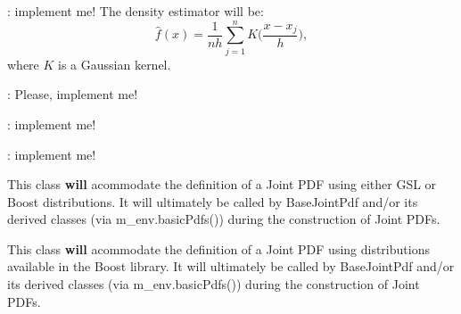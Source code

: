 
\begin{DoxyRefList}
\item[\label{todo__todo000013}%
\hypertarget{todo__todo000013}{}%
Member \hyperlink{class_q_u_e_s_o_1_1_array_of_sequences_a221a49bf0e054276007dde487dbedfe6}{Q\-U\-E\-S\-O\-:\-:Array\-Of\-Sequences$<$ V, M $>$\-:\-:gaussian\-K\-D\-E} (unsigned int initial\-Pos, const V \&scales, const std\-::vector$<$ V $\ast$ $>$ \&evaluation\-Param\-Vecs, std\-::vector$<$ V $\ast$ $>$ \&density\-Vecs) const ]\-: implement me! The density estimator will be\-: \[ \hat{f}(x) = \frac{1}{nh} \sum_{j=1}^n K\Big(\frac{x-x_j}{h}\Big),\] where $ K $ is a Gaussian kernel.  
\item[\label{todo__todo000004}%
\hypertarget{todo__todo000004}{}%
Member \hyperlink{class_q_u_e_s_o_1_1_base1_d1_d_function_ac41e4e15b7f97c14a0389069bf8e833d}{Q\-U\-E\-S\-O\-:\-:Base1\-D1\-D\-Function\-:\-:multiply\-And\-Integrate} (const Base1\-D1\-D\-Function \&func, unsigned int quadrature\-Order, double $\ast$result\-With\-Multiplication\-By\-T\-As\-Well) const ]\-: Please, implement me!  
\item[\label{todo__todo000050}%
\hypertarget{todo__todo000050}{}%
Member \hyperlink{class_q_u_e_s_o_1_1_base_t_k_group_ad6f7aa1ed1f75476b46333847e5086ba}{Q\-U\-E\-S\-O\-:\-:Base\-T\-K\-Group$<$ V, M $>$\-:\-:print} (std\-::ostream \&os) const ]\-: implement me!  
\item[\label{todo__todo000054}%
\hypertarget{todo__todo000054}{}%
Member \hyperlink{class_q_u_e_s_o_1_1_base_vector_r_v_a5296b918534e12e5b62ac7cb5d20a1e8}{Q\-U\-E\-S\-O\-:\-:Base\-Vector\-R\-V$<$ V, M $>$\-:\-:print} (std\-::ostream \&os) const =0]\-: implement me!  
\item[\label{todo__todo000001}%
\hypertarget{todo__todo000001}{}%
Class \hyperlink{class_q_u_e_s_o_1_1_basic_pdfs_base}{Q\-U\-E\-S\-O\-:\-:Basic\-Pdfs\-Base} ]This class {\bfseries will} acommodate the definition of a Joint P\-D\-F using either G\-S\-L or Boost distributions. It will ultimately be called by Base\-Joint\-Pdf and/or its derived classes (via m\-\_\-env.\-basic\-Pdfs()) during the construction of Joint P\-D\-Fs.  
\item[\label{todo__todo000002}%
\hypertarget{todo__todo000002}{}%
Class \hyperlink{class_q_u_e_s_o_1_1_basic_pdfs_boost}{Q\-U\-E\-S\-O\-:\-:Basic\-Pdfs\-Boost} ]This class {\bfseries will} acommodate the definition of a Joint P\-D\-F using distributions available in the Boost library. It will ultimately be called by Base\-Joint\-Pdf and/or its derived classes (via m\-\_\-env.\-basic\-Pdfs()) during the construction of Joint P\-D\-Fs.  

\end{DoxyRefList}
